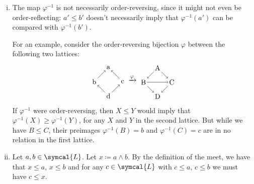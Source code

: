 \begin{solution}
\begin{enumerate}[(i)]
    \item The map \(\varphi^{-1}\) is not necessarily order-reversing, since it might not even be order-reflecting: \(a' \leq b'\) doesn't necessarily imply that \(\varphi^{-1} (a')\) can be compared with \(\varphi^{-1}(b')\).
    
    For an example, consider the order-reversing bijection \(\varphi\) between the following two lattices:
    \[
        \begin{tikzpicture}[baseline=(current bounding box.center)]
            \node (top) at (0, 0) {a};
            \node[below left of = top] (left) {b};
            \node[below right of = top] (right) {c};
            \node[below right of = left] (bottom) {d};
            \draw[->, shorten <=-2pt, shorten >=-2pt,] (left) -- (top);
            \draw[->, shorten <=-2pt, shorten >=-2pt,] (right) -- (top);
            \draw[->, shorten <=-2pt, shorten >=-2pt,] (bottom) -- (left);
            \draw[->, shorten <=-2pt, shorten >=-2pt,] (bottom) -- (right);
        \end{tikzpicture}
        \xrightarrow{\varphi}
        \begin{tikzpicture}[baseline=(current bounding box.center)]
            \node (top) at (0, 0) {A};
            \node[below left of = top] (left) {B};
            \node[below right of = top] (right) {C};
            \node[below right of = left] (bottom) {D};
            \draw[->, shorten <=-2pt, shorten >=-2pt,] (top) -- (left);
            \draw[->, shorten <=-2pt, shorten >=-2pt,] (top) -- (right);
            \draw[->, shorten <=-2pt, shorten >=-2pt,] (left) -- (bottom);
            \draw[->, shorten <=-2pt, shorten >=-2pt,] (right) -- (bottom);
            \draw[->, shorten <=-2pt, shorten >=-2pt,] (left) -- (right);
        \end{tikzpicture}
    \]
    If \(\varphi^{-1}\) were order-reversing, then \(X \leq Y\) would imply that \(\varphi^{-1}(X) \geq \varphi^{-1}(Y)\), for any \(X\) and \(Y\) in the second lattice. But while we have \(B \leq C\), their preimages \(\varphi^{-1}(B) = b\) and \(\varphi^{-1}(C) = c\) are in no relation in the first lattice.

    \item Let \(a, b \in \symcal{L}\). Let \(x \coloneq a \wedge b\). By the definition of the meet, we have that \(x \leq a\), \(x \leq b\) and for any \(c \in \symcal{L}\) with \(c \leq a\), \(c \leq b\) we must have \(c \leq x\).


\end{enumerate}
\end{solution}

